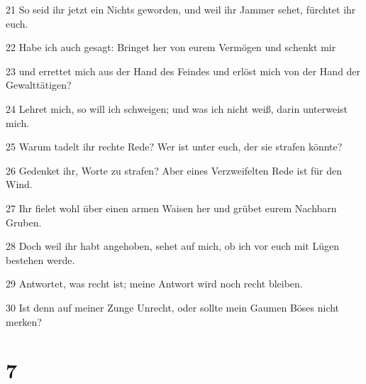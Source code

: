 \par 21 So seid ihr jetzt ein Nichts geworden, und weil ihr Jammer sehet, fürchtet ihr euch.
\par 22 Habe ich auch gesagt: Bringet her von eurem Vermögen und schenkt mir
\par 23 und errettet mich aus der Hand des Feindes und erlöst mich von der Hand der Gewalttätigen?
\par 24 Lehret mich, so will ich schweigen; und was ich nicht weiß, darin unterweist mich.
\par 25 Warum tadelt ihr rechte Rede? Wer ist unter euch, der sie strafen könnte?
\par 26 Gedenket ihr, Worte zu strafen? Aber eines Verzweifelten Rede ist für den Wind.
\par 27 Ihr fielet wohl über einen armen Waisen her und grübet eurem Nachbarn Gruben.
\par 28 Doch weil ihr habt angehoben, sehet auf mich, ob ich vor euch mit Lügen bestehen werde.
\par 29 Antwortet, was recht ist; meine Antwort wird noch recht bleiben.
\par 30 Ist denn auf meiner Zunge Unrecht, oder sollte mein Gaumen Böses nicht merken?

\chapter{7}

